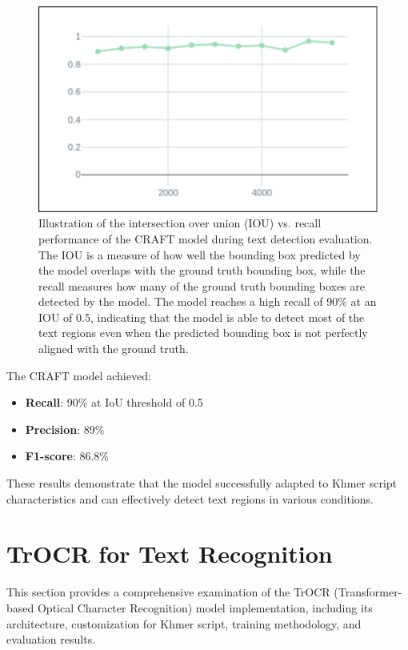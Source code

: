 \begin{figure}[H]
    \centering
    \includegraphics[width=\textwidth]{figures/iou_craft.png}
    \caption{Illustration of the intersection over union (IOU) vs. recall performance of the CRAFT model 
    during text detection evaluation. The IOU is a measure of how well the bounding box predicted 
    by the model overlaps with the ground truth bounding box, while the recall measures how many of 
    the ground truth bounding boxes are detected by the model. The model reaches a high recall of 
    90\% at an IOU of 0.5, indicating that the model is able to detect most of the text regions even 
    when the predicted bounding box is not perfectly aligned with the ground truth.}
    \label{fig:iou-recall-craft}
\end{figure}

The CRAFT model achieved:
\begin{itemize}
\item \textbf{Recall}: 90\% at IoU threshold of 0.5
\item \textbf{Precision}: 89\% 
\item \textbf{F1-score}: 86.8\%
\end{itemize}

These results demonstrate that the model successfully adapted to Khmer script characteristics and can effectively detect text regions in various conditions.

\section{TrOCR for Text Recognition}
\label{sec:trocr-complete}

This section provides a comprehensive examination of the TrOCR (Transformer-based Optical Character Recognition) model implementation, including its architecture, customization for Khmer script, training methodology, and evaluation results.

